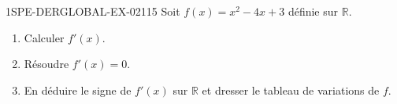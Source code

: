 \begin{exercice}{1SPE-DERGLOBAL-EX-021}{1}{5}
Soit $f(x) = x^2 - 4x + 3$ définie sur $\mathbb{R}$.
\begin{enumerate}
\item Calculer $f'(x)$.
\item Résoudre $f'(x) = 0$.
\item En déduire le signe de $f'(x)$ sur $\mathbb{R}$ et dresser le tableau de variations de $f$.
\end{enumerate}
\end{exercice}
